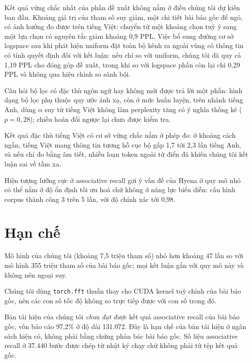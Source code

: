 \documentclass[11pt]{article}
\begin{document}
Kết quả vững chắc nhất của phần đề xuất không nằm ở điều chúng tôi dự kiến ban
đầu.
Khoảng giá trị của tham số suy giảm, một chi tiết bài báo gốc để ngỏ, có ảnh
hưởng đo được trên tiếng Việt: chuyển từ một khoảng chọn tuỳ ý sang một lựa
chọn có nguyên tắc giảm khoảng 0,9 PPL. Việc bổ sung đường cơ sở \textsf{logspace}
sau khi phát hiện \textsf{uniform} đặt toàn bộ kênh ra ngoài vùng có thông tin có
tính quyết định đối với kết luận: nếu chỉ so với \textsf{uniform}, chúng tôi đã quy cả 1,19 PPL
cho đóng góp đề xuất, trong khi so với \textsf{logspace} phần còn lại chỉ 0,29 PPL
và không qua hiệu chỉnh so sánh bội.

Câu hỏi bộ lọc có đặc thù ngôn ngữ hay không mới được trả lời một phần: hình
dạng bộ lọc phụ thuộc quy ước ánh xạ, còn ở mức huấn luyện, trên nhánh tiếng Anh,
dùng $\alpha$ suy từ tiếng Việt không làm perplexity tăng có ý nghĩa
thống kê ($p = 0{,}28$); chiều hoán đổi ngược lại chưa được kiểm tra.

Kết quả đặc thù tiếng Việt có cơ sở vững chắc nằm ở phép đo: ở khoảng cách ngắn, tiếng Việt
mang thông tin tương hỗ cục bộ gấp 1,7 tới 2,3 lần tiếng Anh, và nếu chỉ đo bằng
âm tiết, nhiễu loạn token ngoài từ điển đã khiến chúng tôi kết luận sai về tầm xa.

Hiện tượng lưỡng cực ở associative recall gợi ý vấn đề của Hyena ở quy mô nhỏ có
thể nằm ở độ ổn định tối ưu hoá chứ không ở năng lực biểu diễn: cấu hình corpus
thành công 3 trên 5 lần, với độ chính xác tới 0,98.

\section*{Hạn chế}

Mô hình của chúng tôi (khoảng 7,5 triệu tham số) nhỏ hơn khoảng 47 lần so với
mô hình 355 triệu tham số của bài báo gốc; mọi kết luận gắn với quy mô này và
không nên ngoại suy.

Chúng tôi dùng \texttt{torch.fft} thuần thay cho CUDA kernel tuỳ chỉnh của bài
báo gốc, nên các con số tốc độ không so trực tiếp được với con số trong đó.

Bản tái hiện của chúng tôi \emph{chưa đạt được} kết quả associative recall của
bài báo gốc, vốn báo cáo 97,2\% ở độ dài 131.072. Đây là hạn chế của bản tái
hiện ở ngân sách hiện có, không phải bằng chứng phản bác bài báo gốc. Số liệu
associative recall ở 37.440 bước được chép từ nhật ký chạy chứ không phải từ
tệp kết quả gốc.
\end{document}

